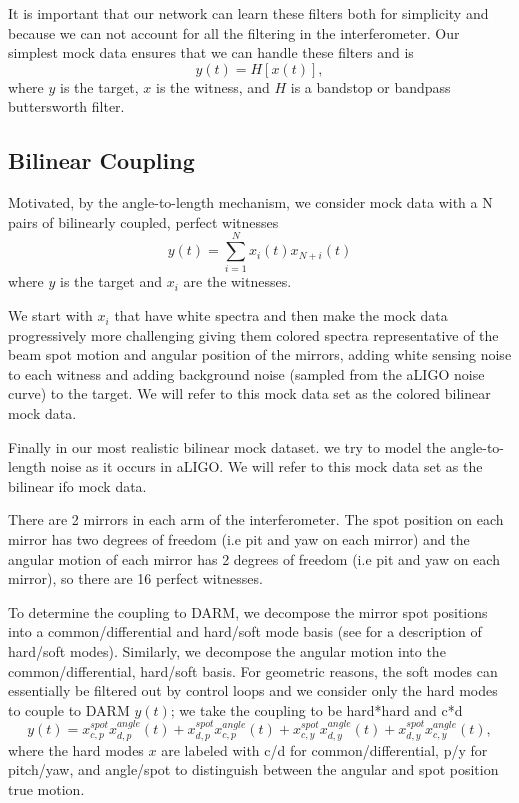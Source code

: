 \begin{refsection}
It is important that our network can learn these filters both for simplicity and because we can not account for all the filtering in the interferometer. Our simplest mock data ensures that we can handle these filters and is 
\begin{equation}
y(t)=H[x(t)],
\end{equation}
where $y$ is the target, $x$ is the witness, and $H$ is a bandstop or bandpass buttersworth filter.


\subsection{Bilinear Coupling}
Motivated, by the angle-to-length mechanism, we consider mock data with a N pairs of bilinearly coupled, perfect witnesses
\begin{equation}
y(t)=\sum_{i=1}^N x_i(t) x_{N+i}(t)
\end{equation}
where $y$ is the target and $x_i$ are the witnesses.

We start with $x_i$ that  have white spectra and then make the mock data progressively more challenging giving them colored spectra representative of the beam spot motion and angular position of the mirrors, adding white sensing noise to each witness and adding background noise (sampled from the aLIGO noise curve) to the target. We will refer to this mock data set as the colored bilinear mock data.

Finally in our most realistic bilinear mock dataset.  we try to model the angle-to-length noise as it occurs in aLIGO. We will refer to this mock data set as the bilinear ifo mock data.

There are 2 mirrors in each arm of the interferometer. The spot position on each mirror has two degrees of freedom (i.e pit and yaw on each mirror) and the angular motion of each mirror has 2 degrees of freedom (i.e pit and yaw on each mirror), so there are 16 perfect witnesses.

To determine the coupling to DARM, we decompose the mirror spot positions into a common/differential and hard/soft mode basis (see \cite{Dooley:13,SIDLES2006167,LIGO:2015} for a description of hard/soft modes). Similarly, we decompose the angular motion into the common/differential, hard/soft basis. For geometric reasons, the soft modes can essentially be filtered out by control loops and we consider only the hard modes to couple to DARM $y(t)$; we take the coupling to be hard*hard and c*d
\begin{equation}
y(t)=x^{spot}_{c, p}x^{angle}_{d,p}(t)+x^{spot}_{d, p}x^{angle}_{c,p}(t)+x^{spot}_{c, y}x^{angle}_{d,y}(t)+x^{spot}_{d, y}x^{angle}_{c,y}(t),
\end{equation}
where the hard modes $x$ are labeled with c/d  for common/differential, p/y for pitch/yaw, and angle/spot to distinguish between the angular and spot position true motion.



\end{refsection}
